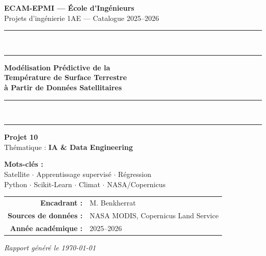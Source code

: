 \documentclass[a4paper,12pt]{report}
\begin{document}
\begin{titlepage}
\begin{center}
\vspace*{0.5cm}

{\large\textbf{ECAM-EPMI --- \'Ecole d'Ing\'enieurs}}\\[6pt]
{\large Projets d'ing\'enierie 1AE --- Catalogue 2025--2026}\\[0.3cm]
\rule{\textwidth}{1.5pt}\\[0.3cm]
{\color{ecamblue}\rule{\textwidth}{0.4pt}}

\vspace{1.2cm}
{\fontsize{22}{28}\selectfont\bfseries\color{ecamblue}
Mod\'elisation Pr\'edictive de la \\[8pt]
Temp\'erature de Surface Terrestre \\[8pt]
\`a Partir de Donn\'ees Satellitaires}

\vspace{0.5cm}
{\color{ecamblue}\rule{\textwidth}{0.4pt}}\\[0.3cm]
\rule{\textwidth}{1.5pt}

\vspace{1.5cm}
{\Large\textbf{Projet 10}} \\[0.3cm]
{\large Th\'ematique : \textbf{IA \& Data Engineering}}

\vspace{1cm}
\begin{tcolorbox}[colback=ecamblue!8, colframe=ecamblue, arc=6pt,
                  width=0.75\textwidth, halign=center]
\textbf{Mots-cl\'es :}\\[4pt]
Satellite $\cdot$ Apprentissage supervis\'e $\cdot$ R\'egression\\
Python $\cdot$ Scikit-Learn $\cdot$ Climat $\cdot$ NASA/Copernicus
\end{tcolorbox}

\vfill
\begin{tabular}{rl}
\textbf{Encadrant :} & M. Benkherrat \\[4pt]
\textbf{Sources de donn\'ees :} & NASA MODIS, Copernicus Land Service \\[4pt]
\textbf{Ann\'ee acad\'emique :} & 2025--2026 \\
\end{tabular}

\vspace{0.8cm}
{\small\textit{Rapport g\'en\'er\'e le \today}}
\end{center}
\end{titlepage}
\end{document}
